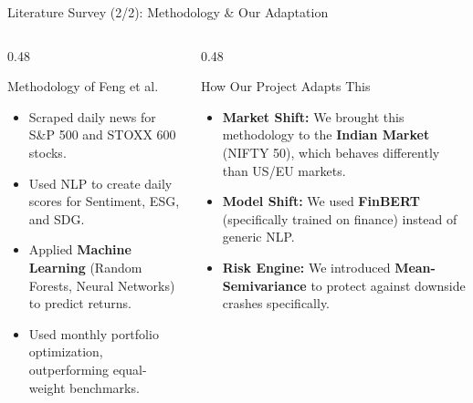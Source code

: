 \documentclass[aspectratio=169, 10pt]{beamer}
\begin{document}
\begin{frame}{Literature Survey (2/2): Methodology \& Our Adaptation}
    \begin{columns}[T]
        \begin{column}{0.48\textwidth}
            \begin{block}{Methodology of Feng et al.}
                \begin{itemize}
                    \item Scraped daily news for S\&P 500 and STOXX 600 stocks.
                    \item Used NLP to create daily scores for Sentiment, ESG, and SDG.
                    \item Applied \textbf{Machine Learning} (Random Forests, Neural Networks) to predict returns.
                    \item Used monthly portfolio optimization, outperforming equal-weight benchmarks.
                \end{itemize}
            \end{block}
        \end{column}
        \begin{column}{0.48\textwidth}
            \begin{block}{How Our Project Adapts This}
                \begin{itemize}
                    \item \textbf{Market Shift:} We brought this methodology to the \textbf{Indian Market} (NIFTY 50), which behaves differently than US/EU markets.
                    \item \textbf{Model Shift:} We used \textbf{FinBERT} (specifically trained on finance) instead of generic NLP.
                    \item \textbf{Risk Engine:} We introduced \textbf{Mean-Semivariance} to protect against downside crashes specifically.
                \end{itemize}
            \end{block}
        \end{column}
    \end{columns}
\end{frame}

\end{document}
